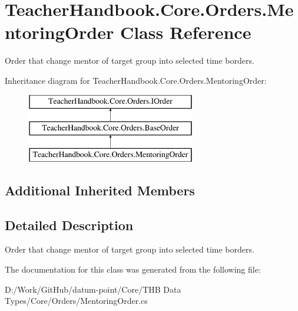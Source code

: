 \hypertarget{class_teacher_handbook_1_1_core_1_1_orders_1_1_mentoring_order}{}\section{Teacher\+Handbook.\+Core.\+Orders.\+Mentoring\+Order Class Reference}
\label{class_teacher_handbook_1_1_core_1_1_orders_1_1_mentoring_order}


Order that change mentor of target group into selected time borders.  


Inheritance diagram for Teacher\+Handbook.\+Core.\+Orders.\+Mentoring\+Order\+:\begin{figure}[H]
\begin{center}
\leavevmode
\includegraphics[height=3.000000cm]{d8/d91/class_teacher_handbook_1_1_core_1_1_orders_1_1_mentoring_order}
\end{center}
\end{figure}
\subsection*{Additional Inherited Members}


\subsection{Detailed Description}
Order that change mentor of target group into selected time borders. 



The documentation for this class was generated from the following file\+:\begin{DoxyCompactItemize}
\item 
D\+:/\+Work/\+Git\+Hub/datum-\/point/\+Core/\+T\+H\+B Data Types/\+Core/\+Orders/Mentoring\+Order.\+cs\end{DoxyCompactItemize}
